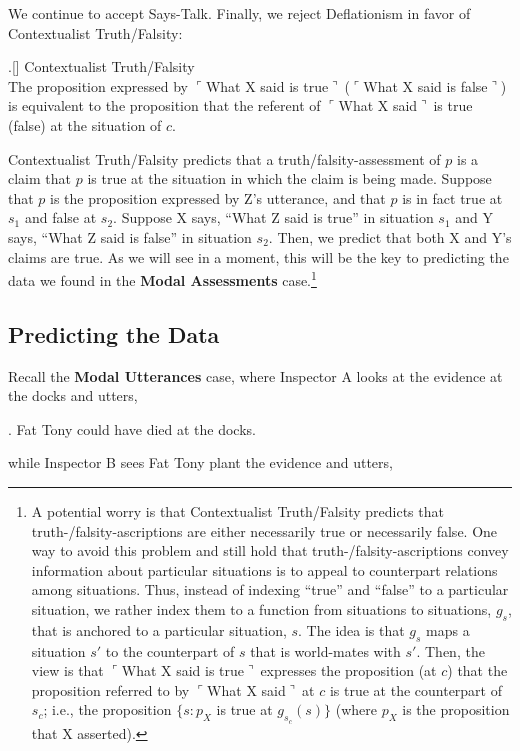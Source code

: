 \documentclass[11pt]{article}
\newcommand{\ul}{$\ulcorner$}
\newcommand{\ur}{$\urcorner\ $}
\newcommand{\urn}{$\urcorner$}
\begin{document}
\begin{doublespace}
We continue to accept {\sc Says-Talk}. Finally, we reject {\sc Deflationism} in favor of {\sc Contextualist Truth/Falsity}:

\ex.[] {\sc Contextualist Truth/Falsity}\\	
	{The proposition expressed by \ul What X said is true\ur (\ul What X said is false\urn) is equivalent to the proposition that the referent of \ul What X said\ur is true (false) at the situation of $c$.} 

{\sc Contextualist Truth/Falsity} predicts that a truth/falsity-assessment of $p$ is a claim that $p$ is true at the situation in which the claim is being made. Suppose that $p$ is the proposition expressed by Z's utterance, and that $p$ is in fact true at $s_1$ and false at $s_2$. Suppose X says, ``What Z said is true'' in situation $s_1$ and Y says, ``What Z said is false'' in situation $s_2$. Then, we predict that both X and Y's claims are true. As we will see in a moment, this will be the key to predicting the data we found in the {\bf Modal Assessments} case.\footnote{A potential worry is that {\sc Contextualist Truth/Falsity} predicts that truth-/falsity-ascriptions are either necessarily true or necessarily false. One way to avoid this problem and still hold that truth-/falsity-ascriptions convey information about particular situations is to appeal to counterpart relations among situations. Thus, instead of indexing ``true'' and ``false'' to a particular situation, we rather index them to a function from situations to situations, $g_s$, that is anchored to a particular situation, $s$. The idea is that $g_s$ maps a situation $s'$ to the counterpart of $s$ that is world-mates with $s'$. Then, the view is that \ul What X said is true\ur expresses the proposition (at $c$) that the proposition referred to by \ul What X said\ur at $c$ is true at the counterpart of $s_c$; i.e., the proposition $\{s: p_X$ is true at $g_{s_c}(s)\}$ (where $p_X$ is the proposition that X asserted).}  

\subsection{Predicting the Data}
\label{3.1}

Recall the {\bf Modal Utterances} case, where Inspector A looks at the evidence at the docks and utters, 

\ex. Fat Tony could have died at the docks. \label{ft1}

while Inspector B sees Fat Tony plant the evidence and utters,


\end{doublespace}
\end{document}
